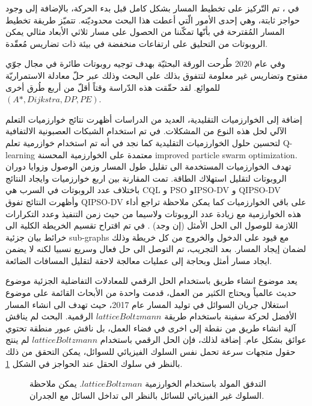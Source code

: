  
  في \cite{b11} ، تم التّركيز على تخطيط المسار بشكل كامل قبل بدء الحركة، بالإضافة إلى وجود حواجز ثابتة، وهي إحدى الأمور الّتي أعطت هذا البحث محدوديّته. تتميّز طريقة تخطيط المسار المُقترحة في \cite{b11} بأنّها تمكّننا من الحصول على مسار ثلاثي الأبعاد مثالي يمكن الروبوتات من التحليق على ارتفاعات منخفضة في بيئة ذات تضاريس مُعقّدة.
  
  وفي عام 2020 طُرحت الورقة البحثيّة \cite{b12} بهدف توجيه روبوتات طائرة في مجال جوّي مفتوح وتضاريس غير معلومة لتتفوق بذلك على البحث \cite{b11} وذلك عبر حلّ معادلة الاستمراريّة للموائع. لقد حقّقت هذه الدّراسة وقتاً أقلّ من أربع طُرق أخرى $( A*, Dijkstra, DP, PE) $.
  
  إضافة إلى الخوارزميات التقليدية، العديد من الدراسات أظهرت نتائج خوارزميات التعلم الآلي لحل هذه النوع من المشكلات. في \cite{c1} تم استخدام الشبكات العصبونية الالتفافية لتحسين حلول الخوارزميات التقليدية كما نجد في \cite{c2} أنه تم استخدام خوازرمية تعلم Q-learning معتمدة على الخوارزمية المحسنة \textenglish{improved particle swarm optimization}. تهدف الخوارزميات المستخدمة الى تقليل طول المسار وزمن الوصول وزوايا دوران الروبوتات لتقليل استهلاك الطاقة. تمت المقارنة بين اربع خوارزميات وايجاد النتائج باختلاف عدد الروبوتات في السرب هي CQL و PSO وIPSO-DV  و QIPSO-DV وأظهرت النتائج تفوق QIPSO-DV على باقي الخوارزميات كما يمكن ملاحظة تراجع أداء هذه الخوارزمية مع زيادة عدد الروبوتات ولاسيما من حيث زمن التنفيذ وعدد التكرارات اللازمة للوصول الى الحل الأمثل (إن وجد) .
  في \cite{c3} تم اقتراح تقسيم الخريطة الكلية الى خرائط بيان جزئية sub-graphs مع قيود على الدخول والخروج من كل خريطة وذلك لضمان إيجاد المسار. بعد التجريب، تم التوصل الى حل فعال وسريع نسبيا لكنه لا يضمن ايجاد مسار أمثل وبحاجة إلى عمليات معالجة لاحقة لتقليل المسافات الضائعة.  
  
   يعد موضوع انشاء طريق باستخدام الحل الرقمي للمعادلات التفاضلية الجزئية موضوع حديث عالمياً ويحتاج الكثير من العمل، قدمت واحدة من الأبحاث القائمة على موضوع استغلال جريان السوائل في توليد المسار عام 2017، حيث تهدف \cite{b13} الى انشاء المسار الأفضل لحركة سفينة باستخدام طريقة $ lattice Boltzmann $ الرقمية. البحث لم يناقش آلية انشاء طريق من نقطة إلى اخرى في فضاء العمل، بل ناقش عبور منطقة تحتوي عوائق بشكل عام. إضافة لذلك، فإن الحل الرقمي باستخدام $ lattice Boltzmann $ لم ينتج حقول متجهات سرعة تحمل نفس السلوك الفيزيائي للسوائل، يمكن التحقق من ذلك بالنظر في سلوك الحقل عند الحواجز في الشكل \ref{06:fig:2}.
   
         
   \begin{figure}[htbp]
   	\centering
   	
   	\caption{التدفق المولد باستخدام الخوارزمية $ lattice Boltzman $. يمكن ملاحظة السلوك غير الفيزيائي للسائل بالنظر الى تداخل السائل مع الجدران.}
   	\label{06:fig:2}
   \end{figure}
   
